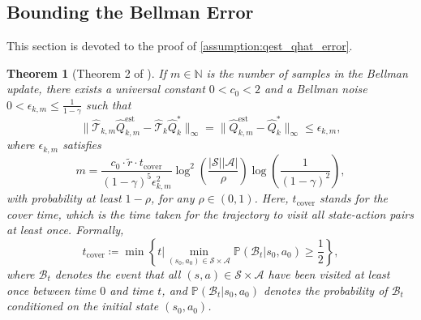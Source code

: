 \documentclass{article}
\theoremstyle{plain}
\newtheorem{theorem}{Theorem}[section]
\theoremstyle{definition}
\def\est{\mathrm{est}}
\def\N{\mathbb{N}}
\begin{document}
\subsection{Bounding the Bellman Error}
This section is devoted to the proof of \cref{assumption:qest_qhat_error}.
\label{bounding bellman error}


\begin{theorem}[Theorem 2 of \citet{9570295}]If $m\in\N$ is the number of samples in the Bellman update, there exists a universal constant $0<c_0<2$ and a Bellman noise $0<\epsilon_{k,m}\leq\frac{1}{1-\gamma}$  such that \[\|\hat{\mathcal{T}}_{k,m}\hat{Q}_{k,m}^{\est} - \hat{\mathcal{T}}_k\hat{Q}_k^*\|_\infty = \|\hat{Q}_{k,m}^\est - \hat{Q}_k^*\|_\infty \leq \epsilon_{k,m},\]
where $\epsilon_{k,m}$ satisfies \begin{equation}\label{yueji_bound}m =  \frac{c_0 \cdot \tilde{r} \cdot t_{\text{cover}}}{(1-\gamma)^5\epsilon_{k,m}^2}\log^2\left(\frac{|\mathcal{S}||\mathcal{A}|}{\rho}\right)\log\left(\frac{1}{(1-\gamma)^2}\right),\end{equation}
with probability at least $1-\rho$, for any $\rho\in (0,1)$. Here, $t_{\text{cover}}$ stands for the cover time, which is the time taken for the trajectory to visit all state-action pairs at least once. Formally, 
\begin{equation}
    t_{\text{cover}}\coloneq \min\left\{t\bigg|\min_{(s_0,a_0)\in \mathcal{S}\times\mathcal{A}}\mathbb{P}(\mathcal{B}_t|s_0,a_0)\geq \frac{1}{2}\right\},
\end{equation}
where $\mathcal{B}_t$ denotes the event that all $(s,a)\in\mathcal{S}\times\mathcal{A}$ have been visited at least once between time $0$ and time $t$, and $\mathbb{P}(\mathcal{B}_t|s_0,a_0)$ denotes the probability of $\mathcal{B}_t$ conditioned on the initial state $(s_0,a_0)$.\qedhere\\
\end{theorem}
\end{document}
